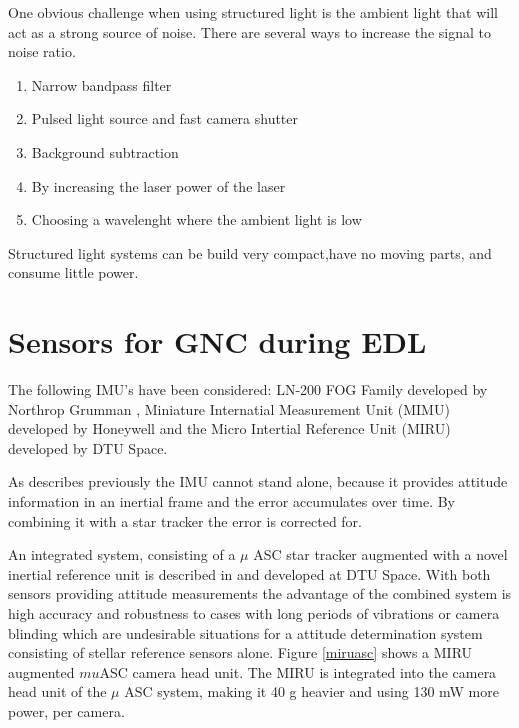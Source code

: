 One obvious challenge when using structured light is the ambient light that will act as a strong source of noise. There are several ways to increase the signal to noise ratio. 

\begin{enumerate}

\item Narrow bandpass filter
\item Pulsed light source and fast camera shutter
\item Background subtraction
\item By increasing the laser power of the laser
\item Choosing a wavelenght where the ambient light is low

\end{enumerate}


Structured light systems can be build very compact,have no moving parts, and consume little power. 






\section{Sensors for GNC during EDL}


The following IMU's have been considered: 
LN-200 FOG Family developed by Northrop Grumman \cite{http://www.northropgrumman.com/Capabilities/LN200FOG/Documents/ln200.pdf}, Miniature Internatial Measurement Unit (MIMU) developed by Honeywell \cite{http://www51.honeywell.com/aero/common/documents/myaerospacecatalog-documents/MIMU.pdf} and the Micro Intertial Reference Unit (MIRU) developed by DTU Space.

As describes previously the IMU cannot stand alone, because it provides attitude information in an inertial frame and the error accumulates over time. By combining it with a star tracker the error is corrected for. 


An integrated system, consisting of a $\mu$ ASC star tracker augmented with a novel inertial reference unit is described in \cite{Bjarno} and developed at DTU Space. With both sensors providing attitude measurements the advantage of the combined system is high accuracy and robustness to cases with long periods of vibrations or camera blinding which are undesirable situations for a attitude determination system consisting of stellar reference sensors alone. Figure \ref{miruasc} shows a MIRU augmented $mu$ASC camera head unit. The MIRU is integrated into the camera head unit of the $\mu$ ASC system, making it 40 g heavier and using 130 mW more power, per camera. 

